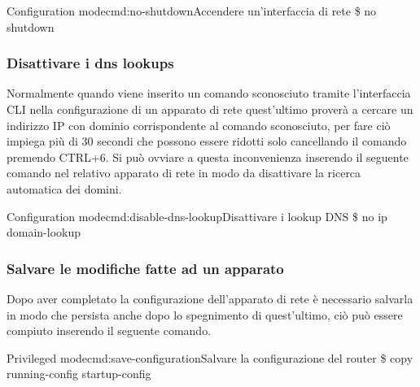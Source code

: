 \begin{cmds}[Interface]{Configuration mode}{cmd:no-shutdown}{Accendere un'interfaccia di rete}
    \$ no shutdown
\end{cmds}

\subsubsection{Disattivare i dns lookups}
Normalmente quando viene inserito un comando sconosciuto tramite l'interfaccia CLI nella configurazione di un apparato di rete quest'ultimo proverà a cercare un indirizzo IP con dominio corrispondente al comando sconosciuto, per fare ciò impiega più di 30 secondi che possono essere ridotti solo cancellando il comando premendo CTRL+6. Si può ovviare a questa inconvenienza inserendo il seguente comando nel relativo apparato di rete in modo da disattivare la ricerca automatica dei domini. 

\begin{cmds}{Configuration mode}{cmd:disable-dns-lookup}{Disattivare i lookup DNS}
    \$ no ip domain-lookup
\end{cmds}

\subsubsection{Salvare le modifiche fatte ad un apparato}
Dopo aver completato la configurazione dell'apparato di rete è necessario salvarla in modo che persista anche dopo lo spegnimento di quest'ultimo, ciò può essere compiuto inserendo il seguente comando.  

\begin{cmds}{Privileged mode}{cmd:save-configuration}{Salvare la configurazione del router}
    \$ copy running-config startup-config %
\end{cmds}
